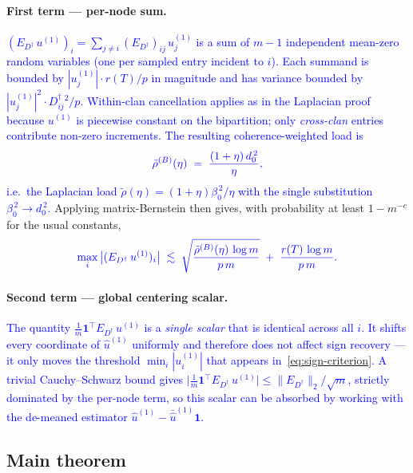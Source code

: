 \documentclass[11pt]{article}
\newcommand{\new}[1]{\textcolor{blue}{#1}}
\newcommand{\newmath}[1]{{\color{blue} #1}}
\theoremstyle{remark}
\newcommand{\1}{\mathbf{1}}
\newcommand{\Ddist}{D^{\dagger}}      %
\newcommand{\hatu}{\widehat{u}}
\newcommand{\rT}{r(T)}                %
\begin{document}
\paragraph{First term --- per-node sum.}
\new{$(E_{\Ddist}\,u^{(1)})_{i} = \sum_{j \ne i} (E_{\Ddist})_{ij}\,u^{(1)}_{j}$
is a sum of $m-1$ independent mean-zero random variables (one per
sampled entry incident to $i$). Each summand is bounded by
$|u^{(1)}_{j}|\cdot \rT/p$ in magnitude and has variance bounded by
$|u^{(1)}_{j}|^{2}\cdot \Ddist_{ij}^{2}/p$.
Within-clan cancellation applies as in the Laplacian proof because
$u^{(1)}$ is piecewise constant on the bipartition; only \emph{cross-clan}
entries contribute non-zero increments. The resulting
coherence-weighted load is}
\begin{equation}
\newmath{
  \tilde\rho^{(B)}(\eta) \;=\; \frac{(1 + \eta)\,d_{0}^{\,2}}{\eta},
}
\end{equation}
\new{i.e.\ the Laplacian load $\tilde\rho(\eta) = (1+\eta)\beta_{0}^{\,2}/\eta$
with the single substitution $\beta_{0}^{\,2} \to d_{0}^{\,2}$.}
Applying matrix-Bernstein then gives, with probability at least
$1 - m^{-c}$ for the usual constants,
\begin{equation}
\newmath{
  \max_{i}\,\bigl|(E_{\Ddist}\,u^{(1)})_{i}\bigr|
  \;\lesssim\;
  \sqrt{\frac{\tilde\rho^{(B)}(\eta)\,\log m}{p\,m}}
  \;+\;
  \frac{\rT\,\log m}{p\,m}.
}
\end{equation}

\paragraph{Second term --- global centering scalar.}
\new{The quantity $\frac{1}{m}\1^{\!\top}E_{\Ddist}\,u^{(1)}$ is a
\emph{single scalar} that is identical across all $i$.  It shifts every
coordinate of $\hatu^{(1)}$ uniformly and therefore does not affect sign
recovery --- it only moves the threshold $\min_{i}|u^{(1)}_{i}|$ that
appears in~\eqref{eq:sign-criterion}.  A trivial Cauchy--Schwarz bound
gives $\bigl|\tfrac{1}{m}\1^{\!\top}E_{\Ddist}\,u^{(1)}\bigr| \le
\|E_{\Ddist}\|_{2}/\sqrt m$, strictly dominated by the per-node term, so
this scalar can be absorbed by working with the de-meaned estimator
$\hatu^{(1)} - \bar{\hatu}^{(1)}\1$.}

\subsection{Main theorem}
\end{document}
